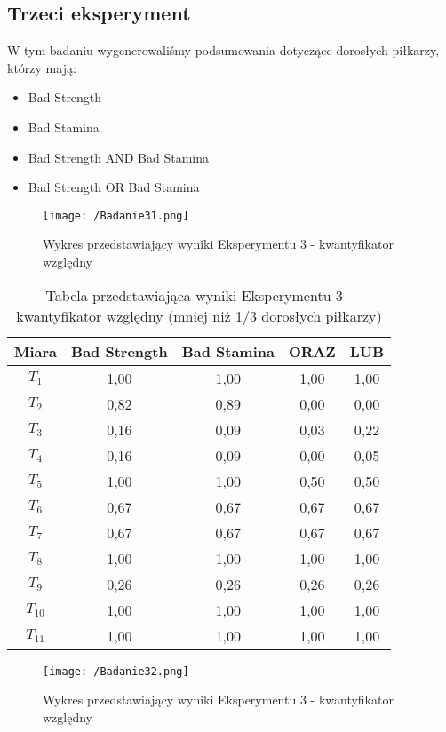 \documentclass{classrep}
\begin{document}
\subsection{Trzeci eksperyment}
W tym badaniu wygenerowaliśmy podsumowania dotyczące dorosłych piłkarzy, którzy mają:
\begin{itemize}
    \item Bad Strength
    \item Bad Stamina
    \item Bad Strength AND Bad Stamina
    \item Bad Strength OR Bad Stamina
\end{itemize}

\begin{figure}[H]
	\centering
	\texttt{[image: /Badanie31.png]}
	\caption{Wykres przedstawiający wyniki Eksperymentu 3 - kwantyfikator względny}
\end{figure}


\begin{table}[H]
	\centering
	\begin{tabular}{c c c c c } 
		\hline
		\textbf{Miara} & \textbf{Bad Strength} & \textbf{Bad Stamina} & \textbf{ORAZ} & \textbf{LUB}\\ [0.5ex] 
		\hline
		\hline 
            $T_1$ & 1,00 & 1,00 & 1,00 & 1,00\\
            $T_2$ & 0,82 & 0,89 & 0,00 & 0,00\\
            $T_3$ & 0,16 & 0,09 & 0,03 & 0,22\\
            $T_4$ & 0,16 & 0,09 & 0,00 & 0,05\\
            $T_5$ & 1,00 & 1,00 & 0,50 & 0,50\\
            $T_6$ & 0,67 & 0,67 & 0,67 & 0,67\\
            $T_7$ & 0,67 & 0,67 & 0,67 & 0,67\\
            $T_8$ & 1,00 & 1,00 & 1,00 & 1,00\\
            $T_9$ & 0,26 & 0,26 & 0,26 & 0,26\\
            $T_{10}$ & 1,00 & 1,00 & 1,00 & 1,00\\
            $T_{11}$ & 1,00 & 1,00 & 1,00 & 1,00\\
		\hline
	\end{tabular}
	\caption{Tabela przedstawiająca wyniki Eksperymentu 3 - kwantyfikator względny (mniej niż 1/3 dorosłych piłkarzy)}
\end{table}

\begin{figure}[H]
	\centering
	\texttt{[image: /Badanie32.png]}
	\caption{Wykres przedstawiający wyniki Eksperymentu 3 - kwantyfikator względny}
\end{figure}
\end{document}
